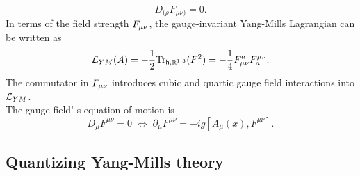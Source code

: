 \begin{enumerate}
\begin{equation}
	D_{(\rho} F_{\mu \nu)} = 0.
\end{equation}
In terms of the field strength $F_{\mu \nu}$, the gauge-invariant Yang-Mills Lagrangian can be written as
\begin{equation}
	\mathcal{L}_{YM} (A) = - \frac{1}{2} \mathrm{Tr}_{\mathsf{h},\mathbb{R}^{1,3}} (F^2) = -\frac{1}{4} F^a_{\mu \nu} F^{\mu \nu}_a.
\end{equation}
The commutator in $F_{\mu \nu}$ introduces cubic and quartic gauge field interactions into $\mathcal{L}_{YM}$.\\
The gauge field' s equation of motion is
\begin{equation}
	D_\mu F^{\mu \nu } = 0 \; \Leftrightarrow \; \partial_\mu F^{\mu \nu} = -ig [A_\mu(x) , F^{\mu \nu}].
\end{equation}
\end{enumerate}

\subsection{Quantizing Yang-Mills theory}
